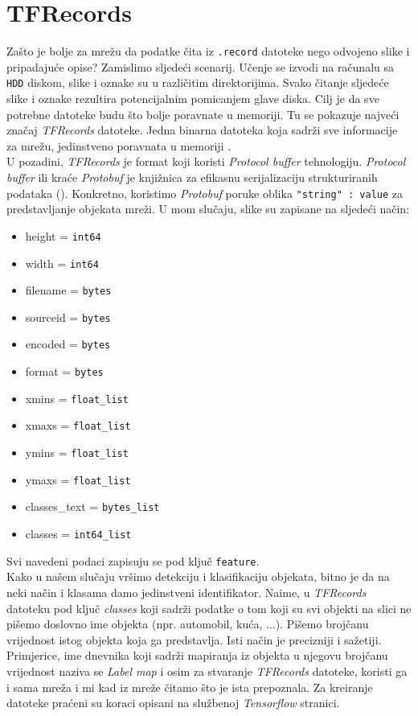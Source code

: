 \section{TFRecords}
Zašto je bolje za mrežu da podatke čita iz \texttt{.record} datoteke nego odvojeno slike i pripadajuće opise?
Zamislimo sljedeći scenarij.
Učenje se izvodi na računalu sa \texttt{HDD} diskom, slike i oznake su u različitim direktorijima.
Svako čitanje sljedeće slike i oznake rezultira potencijalnim pomicanjem glave diska.
Cilj je da sve potrebne datoteke budu što bolje poravnate u memoriji.
Tu se pokazuje najveći značaj \emph{TFRecords} datoteke. 
Jedna binarna datoteka koja sadrži sve informacije za mrežu, jedinstveno poravnata u memoriji \cite{TFRecords}. \\
U pozadini, \emph{TFRecords} je format koji koristi \emph{Protocol buffer} tehnologiju.
\emph{Protocol buffer} ili kraće \emph{Protobuf} je knjižnica za efikasnu serijalizaciju strukturiranih podataka (\cite{tensorflow.org}).
Konkretno, koristimo \emph{Protobuf} poruke oblika \texttt{"string" : value} za predstavljanje objekata mreži.
U mom slučaju, slike su zapisane na sljedeći način:
\begin{itemize}
\item height = \texttt{int64}
\item width = \texttt{int64}
\item filename = \texttt{bytes}
\item sourceid = \texttt{bytes}
\item encoded = \texttt{bytes}
\item format = \texttt{bytes}
\item xmins = \texttt{float\_list}
\item xmaxs = \texttt{float\_list}
\item ymins = \texttt{float\_list}
\item ymaxs = \texttt{float\_list}
\item classes\_text = \texttt{bytes\_list}
\item classes = \texttt{int64\_list}
\
\end{itemize}
Svi navedeni podaci zapisuju se pod ključ \texttt{feature}. \\
Kako u našem slučaju vršimo detekciju i klasifikaciju objekata, bitno je da na neki način i klasama damo jedinstveni identifikator.
Naime, u \emph{TFRecords} datoteku pod ključ \emph{classes} koji sadrži podatke o tom koji su svi objekti na slici ne pišemo doslovno ime objekta (npr. automobil, kuća, ...).
Pišemo brojčanu vrijednost istog objekta koja ga predstavlja. 
Isti način je precizniji i sažetiji. \\
Primjerice, ime dnevnika koji sadrži mapiranja iz objekta u njegovu brojčanu vrijednost naziva se \emph{Label map} i osim za stvaranje \emph{TFRecords} datoteke, koristi ga i sama mreža i mi kad iz mreže čitamo što je ista prepoznala.
Za kreiranje datoteke praćeni su koraci opisani na službenoj \emph{Tensorflow} stranici.

